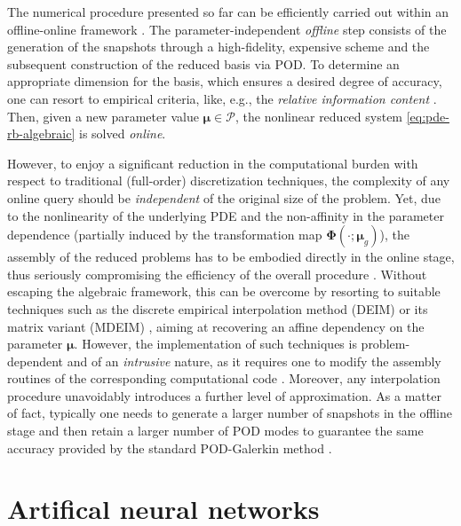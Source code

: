 \documentclass[longtitle]{elsarticle}
\numberwithin{equation}{section}
\theoremstyle{theorem}
\theoremstyle{definition}
\theoremstyle{remark}
\theoremstyle{proposition}
\numberwithin{figure}{section}
\newcommand{\bg}[1]{\boldsymbol{#1}}
\begin{document}
		The numerical procedure presented so far can be efficiently carried out within an offline-online framework \cite{Pru02}. The parameter-independent \emph{offline} step consists of the generation of the snapshots through a high-fidelity, expensive scheme and the subsequent construction of the reduced basis via POD. To determine an appropriate dimension for the basis, which ensures a desired degree of accuracy, one can resort to empirical criteria, like, e.g., the \emph{relative information content} \cite{QMN15}. Then, given a new parameter value $\bg{\mu} \in \mathcal{P}$, the nonlinear reduced system \eqref{eq:pde-rb-algebraic} is solved \emph{online}.				

		However, to enjoy a significant reduction in the computational burden with respect to traditional (full-order) discretization techniques, the complexity of any online query should be \emph{independent} of the original size of the problem. Yet, due to the nonlinearity of the underlying PDE and the non-affinity in the parameter dependence (partially induced by the transformation map $\bg{\Phi}(\cdot; \bg{\mu}_g)$), the assembly of the reduced problems has to be embodied directly in the online stage, thus seriously compromising the efficiency of the overall procedure \cite{Bar04}. Without escaping the algebraic framework, this can be overcome by resorting to suitable techniques such as the discrete empirical interpolation method (DEIM) \cite{Cha10} or its matrix variant (MDEIM) \cite{NMA15}, aiming at recovering an affine dependency on the parameter $\bg{\mu}$. However, the implementation of such techniques is problem-dependent and of an \emph{intrusive} nature, as it requires one to modify the assembly routines of the corresponding computational code \cite{Cas15}. Moreover, any interpolation procedure unavoidably introduces a further level of approximation. As a matter of fact, typically one needs to generate a larger number of snapshots in the offline stage and then retain a larger number of POD modes to guarantee the same accuracy provided by the standard POD-Galerkin method \cite{Bar04}.		
		
	
	\section{Artifical neural networks}
	\label{section:Artificial neural networks}
	
\end{document}
